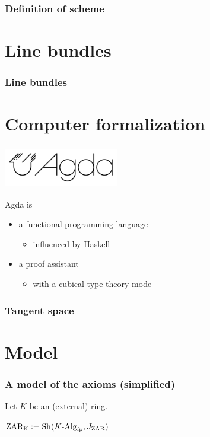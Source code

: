 \documentclass[aspectratio=1610]{beamer}
\begin{document}
\begin{frame}
  \frametitle{Definition of scheme}
\end{frame}

\section{Line bundles}

\begin{frame}
  \frametitle{Line bundles}
\end{frame}

\section{Computer formalization}

\begin{frame}
  \frametitle{\includegraphics[width=5cm]{./images/agda-logo.png}}

  Agda is
  \begin{itemize}
    \item
      a functional programming language
      \begin{itemize}
        \item
          influenced by Haskell
      \end{itemize}
    \item
      a proof assistant
      \begin{itemize}
        \item
          with a \alert{cubical type theory} mode
      \end{itemize}
  \end{itemize}
\end{frame}

\begin{frame}
  \frametitle{Tangent space}
\end{frame}

\section{Model}

\begin{frame}
  \frametitle{A model of the axioms (simplified)}

  Let $K$ be an (external) ring.

  \bigskip
  $\mathrm{ZAR_K} := \mathrm{Sh}(K\text{-}\mathrm{Alg}_{\mathrm{fp}}, J_{\mathrm{ZAR}})$
\end{frame}
\end{document}
